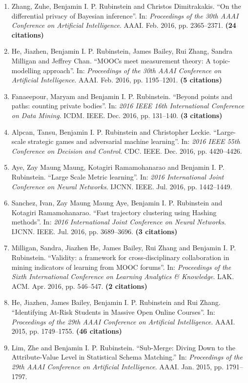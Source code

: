 \documentclass[a4paper,12pt]{article}
\begin{document}
\begin{enumerate}
\item Zhang, Zuhe, Benjamin I. P. Rubinstein and Christos Dimitrakakis.
``On the differential privacy of Bayesian inference''.
In: 
\emph{Proceedings of the 30th AAAI Conference on Artificial Intelligence}.
AAAI.
Feb. 2016, pp. 2365--2371.
 \textbf{(24 citations)}
\item He, Jiazhen, Benjamin I. P. Rubinstein, James Bailey, Rui Zhang, Sandra Milligan and Jeffrey Chan.
``MOOCs meet measurement theory: A topic-modelling approach''.
In: 
\emph{Proceedings of the 30th AAAI Conference on Artificial Intelligence}.
AAAI.
Feb. 2016, pp. 1195--1201.
 \textbf{(5 citations)}
\item Fanaeepour, Maryam and Benjamin I. P. Rubinstein.
``Beyond points and paths: counting private bodies''.
In: 
\emph{2016 IEEE 16th International Conference on Data Mining}.
ICDM.
IEEE.
Dec. 2016, pp. 131--140.
 \textbf{(3 citations)}
\item Alpcan, Tansu, Benjamin I. P. Rubinstein and Christopher Leckie.
``Large-scale strategic games and adversarial machine learning''.
In: 
\emph{2016 IEEE 55th Conference on Decision and Control}.
CDC.
IEEE.
Dec. 2016, pp. 4420--4426.

\item Aye, Zay Maung Maung, Kotagiri Ramamohanarao and Benjamin I. P. Rubinstein.
``Large Scale Metric learning''.
In: 
\emph{2016 International Joint Conference on Neural Networks}.
IJCNN.
IEEE.
Jul. 2016, pp. 1442--1449.

\item Sanchez, Ivan, Zay Maung Maung Aye, Benjamin I. P. Rubinstein and Kotagiri Ramamohanarao.
``Fast trajectory clustering using Hashing methods''.
In: 
\emph{2016 International Joint Conference on Neural Networks}.
IJCNN.
IEEE.
Jul. 2016, pp. 3689--3696.
 \textbf{(3 citations)}
\item Milligan, Sandra, Jiazhen He, James Bailey, Rui Zhang and Benjamin I. P. Rubinstein.
``Validity: a framework for cross-disciplinary collaboration in mining indicators of learning from MOOC forums''.
In: 
\emph{Proceedings of the Sixth International Conference on Learning Analytics \& Knowledge}.
LAK.
ACM.
Apr. 2016, pp. 546--547.
 \textbf{(2 citations)}
\item He, Jiazhen, James Bailey, Benjamin I. P. Rubinstein and Rui Zhang.
``Identifying At-Risk Students in Massive Open Online Courses''.
In: 
\emph{Proceedings of the 29th AAAI Conference on Artificial Intelligence}.
AAAI.
2015, pp. 1749--1755.
 \textbf{(46 citations)}
\item Lim, Zhe and Benjamin I. P. Rubinstein.
``Sub-Merge: Diving Down to the Attribute-Value Level in Statistical Schema Matching.''
In: 
\emph{Proceedings of the 29th AAAI Conference on Artificial Intelligence}.
AAAI.
Jan. 2015, pp. 1791--1797.


\end{enumerate}
\end{document}
